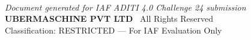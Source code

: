 \documentclass[11pt,a4paper]{article}
\begin{document}
\vspace{1cm}
\begin{center}
\\[0.4cm]
\small\color{dgray}
\textit{Document generated for IAF ADITI 4.0 Challenge 24 submission}\\
\textbf{\color{dblue}UBERMASCHINE PVT LTD} \textbar\ All Rights Reserved\\
Classification: RESTRICTED --- For IAF Evaluation Only
\end{center}
\end{document}
